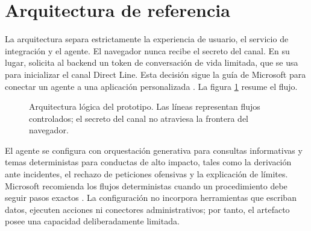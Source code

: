 \documentclass[12pt,twoside,titlepage]{book}
\begin{document}
\section{Arquitectura de referencia}

La arquitectura separa estrictamente la experiencia de usuario, el servicio de integraci\'on y el agente. El navegador nunca recibe el secreto del canal. En su lugar, solicita al backend un token de conversaci\'on de vida limitada, que se usa para inicializar el canal Direct Line. Esta decisi\'on sigue la gu\'ia de Microsoft para conectar un agente a una aplicaci\'on personalizada \cite{copilotDirectLine,copilotWebSecurity}. La figura \ref{fig:arquitectura} resume el flujo.

\begin{figure}[H]
\centering
{}
\caption{Arquitectura l\'ogica del prototipo. Las l\'ineas representan flujos controlados; el secreto del canal no atraviesa la frontera del navegador.}
\label{fig:arquitectura}
\end{figure}

El agente se configura con orquestaci\'on generativa para consultas informativas y temas deterministas para conductas de alto impacto, tales como la derivaci\'on ante incidentes, el rechazo de peticiones ofensivas y la explicaci\'on de l\'imites. Microsoft recomienda los flujos deterministas cuando un procedimiento debe seguir pasos exactos \cite{copilotOrchestration}. La configuraci\'on no incorpora herramientas que escriban datos, ejecuten acciones ni conectores administrativos; por tanto, el artefacto posee una capacidad deliberadamente limitada.
\end{document}
